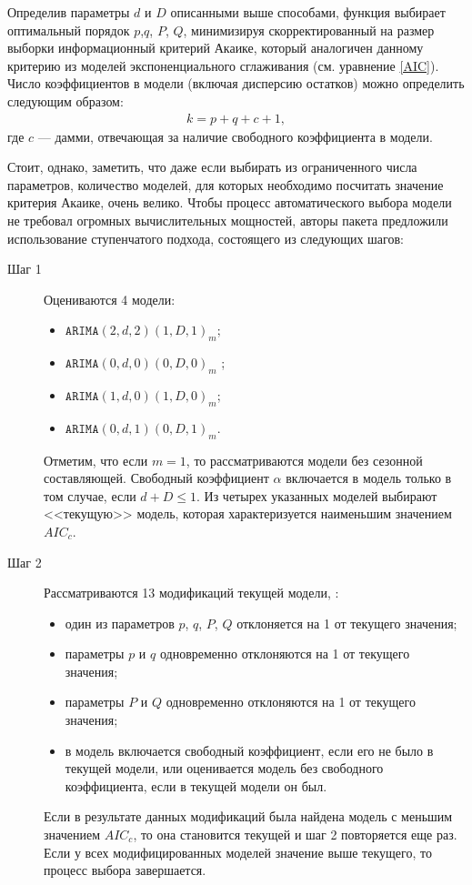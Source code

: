 Определив параметры $d$ и $D$ описанными выше способами, функция  выбирает оптимальный порядок $p$,$q$, $P$, $Q$, минимизируя скорректированный на размер выборки информационный критерий Акаике, который аналогичен данному критерию из моделей экспоненциального сглаживания (см. уравнение \eqref{AIC}). Число коэффициентов в модели (включая дисперсию остатков) можно определить следующим образом:
\begin{align*}
k = p + q + c + 1,
\end{align*}
где $c$ --- дамми, отвечающая за наличие свободного коэффициента в модели.

Стоит, однако, заметить, что даже если выбирать из ограниченного числа параметров, количество моделей, для которых необходимо посчитать значение критерия Акаике, очень велико. Чтобы процесс автоматического выбора модели не требовал огромных вычислительных мощностей, авторы пакета предложили использование ступенчатого подхода, состоящего из следующих шагов:
\begin{description}
\item[Шаг 1] Оцениваются 4 модели:
\begin{itemize}
\item $\texttt{ARIMA}(2,d,2)(1,D,1)_m $;
\item $\texttt{ARIMA}(0,d,0)(0,D,0)_m$ ;
\item $\texttt{ARIMA}(1,d,0)(1,D,0)_m $;
\item $\texttt{ARIMA}(0,d,1)(0,D,1)_m $.
\end{itemize}
Отметим, что если $m = 1$, то рассматриваются модели без сезонной составляющей. Свободный коэффициент $\alpha$ включается в модель только в том случае, если $d + D \leq 1$. Из четырех указанных моделей выбирают <<текущую>> модель, которая характеризуется наименьшим значением $AIC_c$.

\item[Шаг 2] Рассматриваются 13 модификаций текущей модели, :
\begin{itemize}
\item один из параметров $p$, $q$, $P$, $Q$ отклоняется на 1 от текущего значения;
\item параметры $p$ и $q$ одновременно отклоняются на 1 от текущего значения;
\item параметры $P$ и $Q$ одновременно отклоняются на 1 от текущего значения;
\item в модель включается свободный коэффициент, если его не было в текущей модели, или оценивается модель без свободного коэффициента, если в текущей модели он был.
\end{itemize}
Если в результате данных модификаций была найдена модель с меньшим значением $AIC_c$, то она становится текущей и шаг 2 повторяется еще раз. Если у всех модифицированных моделей значение выше текущего, то процесс выбора завершается.
\end{description}

